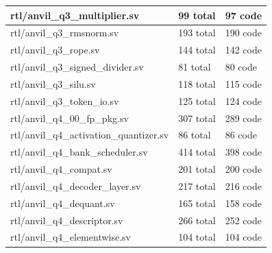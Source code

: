 \documentclass[11pt,a4paper]{article}
\begin{document}
{\begin{longtable}{@{}L{0.55\textwidth}|L{0.18\textwidth}|L{0.18\textwidth}@{}}
rtl/\allowbreak{}anvil\_\allowbreak{}q3\_\allowbreak{}multiplier.sv & 99 total & 97 code\\[2pt]\hline

rtl/\allowbreak{}anvil\_\allowbreak{}q3\_\allowbreak{}rmsnorm.sv & 193 total & 190 code\\[2pt]\hline

rtl/\allowbreak{}anvil\_\allowbreak{}q3\_\allowbreak{}rope.sv & 144 total & 142 code\\[2pt]\hline

rtl/\allowbreak{}anvil\_\allowbreak{}q3\_\allowbreak{}signed\_\allowbreak{}divider.sv & 81 total & 80 code\\[2pt]\hline

rtl/\allowbreak{}anvil\_\allowbreak{}q3\_\allowbreak{}silu.sv & 118 total & 115 code\\[2pt]\hline

rtl/\allowbreak{}anvil\_\allowbreak{}q3\_\allowbreak{}token\_\allowbreak{}io.sv & 125 total & 124 code\\[2pt]\hline

rtl/\allowbreak{}anvil\_\allowbreak{}q4\_\allowbreak{}00\_\allowbreak{}fp\_\allowbreak{}pkg.sv & 307 total & 289 code\\[2pt]\hline

rtl/\allowbreak{}anvil\_\allowbreak{}q4\_\allowbreak{}activation\_\allowbreak{}quantizer.sv & 86 total & 86 code\\[2pt]\hline

rtl/\allowbreak{}anvil\_\allowbreak{}q4\_\allowbreak{}bank\_\allowbreak{}scheduler.sv & 414 total & 398 code\\[2pt]\hline

rtl/\allowbreak{}anvil\_\allowbreak{}q4\_\allowbreak{}compat.sv & 201 total & 200 code\\[2pt]\hline

rtl/\allowbreak{}anvil\_\allowbreak{}q4\_\allowbreak{}decoder\_\allowbreak{}layer.sv & 217 total & 216 code\\[2pt]\hline

rtl/\allowbreak{}anvil\_\allowbreak{}q4\_\allowbreak{}dequant.sv & 165 total & 158 code\\[2pt]\hline

rtl/\allowbreak{}anvil\_\allowbreak{}q4\_\allowbreak{}descriptor.sv & 266 total & 252 code\\[2pt]\hline

rtl/\allowbreak{}anvil\_\allowbreak{}q4\_\allowbreak{}elementwise.sv & 104 total & 104 code\\[2pt]\hline


\end{longtable}}
\end{document}
